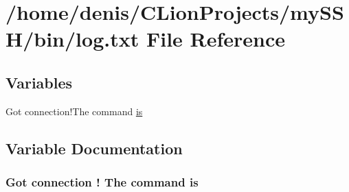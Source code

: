 \hypertarget{log_8txt}{}\section{/home/denis/\+C\+Lion\+Projects/my\+S\+S\+H/bin/log.txt File Reference}
\label{log_8txt}
\subsection*{Variables}
\begin{DoxyCompactItemize}
\item 
Got connection!\+The command \hyperlink{log_8txt_a9e671be5527b814092f6de952ccbec8c}{is}
\end{DoxyCompactItemize}


\subsection{Variable Documentation}
\subsubsection[{\texorpdfstring{is}{is}}]{\setlength{\rightskip}{0pt plus 5cm}Got connection ! The command is}\hypertarget{log_8txt_a9e671be5527b814092f6de952ccbec8c}{}\label{log_8txt_a9e671be5527b814092f6de952ccbec8c}
